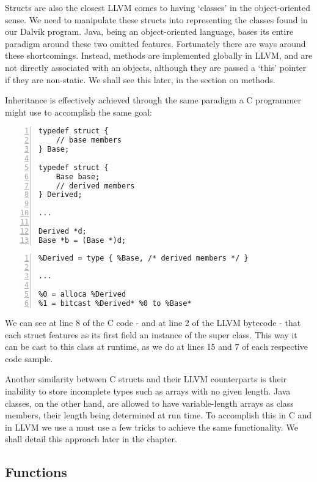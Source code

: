 Structs are also the closest LLVM comes to having `classes' in the object-oriented sense. We need to manipulate these structs into representing the classes found in our Dalvik program. Java, being an object-oriented language, bases its entire paradigm around these two omitted features. Fortunately there are ways around these shortcomings. Instead, methods are implemented globally in LLVM, and are not directly associated with an objects, although they are passed a `this' pointer if they are non-static. We shall see this later, in the section on methods. 

Inheritance is effectively achieved through the same paradigm a C programmer might use to accomplish the same goal:

\lstset{
	language=C,
	basicstyle=\small,
	stringstyle=\ttfamily
}

\begin{lstlisting}[frame=single, numbers=left, numberstyle=\tiny, title=C code]
typedef struct {
    // base members
} Base;

typedef struct {
    Base base;  
    // derived members   
} Derived;

...

Derived *d;
Base *b = (Base *)d;
\end{lstlisting}

\begin{lstlisting}[frame=single, numbers=left, numberstyle=\tiny, title= LLVM IR]
%Base = type { /* base members */ }
%Derived = type { %Base, /* derived members */ }

...

%0 = alloca %Derived
%1 = bitcast %Derived* %0 to %Base*
\end{lstlisting}

We can see at line 8 of the C code - and at line 2 of the LLVM bytecode - that each struct features as its first field an instance of the super class. This way it can be cast to this class at runtime, as we do at lines 15 and 7 of each respective code sample.

Another similarity between C structs and their LLVM counterparts is their inability to store incomplete types such as arrays with no given length. Java classes, on the other hand, are allowed to have variable-length arrays as class members, their length being determined at run time. To accomplish this in C and in LLVM we use a must use a few tricks to achieve the same functionality. We shall detail this approach later in the chapter.

\subsection*{Functions}

